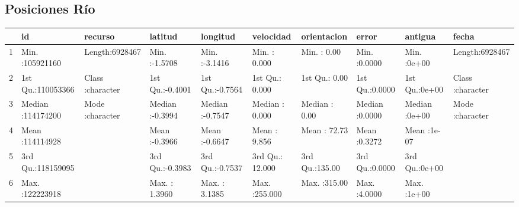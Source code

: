 \documentclass{article}
\begin{document}
\subsection{Posiciones Río}
\begin{table}[ht]
\centering
  \begin{tabular}{rlllllllll}
    \hline
   &       id &   recurso &    latitud &    longitud &   velocidad &  orientacion &     error &    antigua &    fecha \\ 
    \hline
  1 & Min.   :105921160   & Length:6928467     & Min.   :-1.5708   & Min.   :-3.1416   & Min.   :  0.000   & Min.   :  0.00   & Min.   :0.0000   & Min.   :0e+00   & Length:6928467     \\ 
    2 & 1st Qu.:110053366   & Class :character   & 1st Qu.:-0.4001   & 1st Qu.:-0.7564   & 1st Qu.:  0.000   & 1st Qu.:  0.00   & 1st Qu.:0.0000   & 1st Qu.:0e+00   & Class :character   \\ 
    3 & Median :114174200   & Mode  :character   & Median :-0.3994   & Median :-0.7547   & Median :  0.000   & Median :  0.00   & Median :0.0000   & Median :0e+00   & Mode  :character   \\ 
    4 & Mean   :114114928   &  & Mean   :-0.3966   & Mean   :-0.6647   & Mean   :  9.856   & Mean   : 72.73   & Mean   :0.3272   & Mean   :1e-07   &  \\ 
    5 & 3rd Qu.:118159095   &  & 3rd Qu.:-0.3983   & 3rd Qu.:-0.7537   & 3rd Qu.: 12.000   & 3rd Qu.:135.00   & 3rd Qu.:0.0000   & 3rd Qu.:0e+00   &  \\ 
    6 & Max.   :122223918   &  & Max.   : 1.3960   & Max.   : 3.1385   & Max.   :255.000   & Max.   :315.00   & Max.   :4.0000   & Max.   :1e+00   &  \\ 
     \hline
  \end{tabular}
\end{table}
\end{document}
